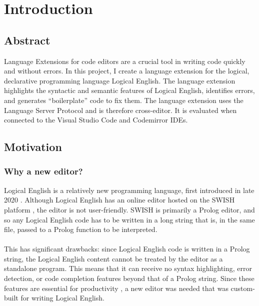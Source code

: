 \documentclass[../main.tex]{subfiles}
\begin{document}
\chapter{Introduction}
\section{Abstract}
Language Extensions for code editors are a crucial tool in writing code quickly and without errors. In this project, I create a language extension for the logical, declarative programming language Logical English. The language extension highlights the syntactic and semantic features of Logical English, identifies errors, and generates ``boilerplate'' code to fix them. The language extension uses the Language Server Protocol and is therefore cross-editor. It is evaluated when connected to the Visual Studio Code and Codemirror IDEs.
\section{Motivation}
\subsection{Why a new editor?}
Logical English is a relatively new programming language, first introduced in late 2020 \cite{logical_english} . Although Logical English has an online editor hosted on the SWISH platform \cite{swish_editor}, the editor is not user-friendly. SWISH is primarily a Prolog editor, and so any Logical English code has to be written in a long string that is, in the same file, passed to a Prolog function to be interpreted. 
\\ \\ 
This has significant drawbacks: since Logical English code is written in a Prolog string, the Logical English content cannot be treated by the editor as a standalone program. This means that it can receive no syntax highlighting, error detection, or code completion features beyond that of a Prolog string. Since these features are essential for productivity , a new editor was needed that was custom-built for writing Logical English.
\end{document}
